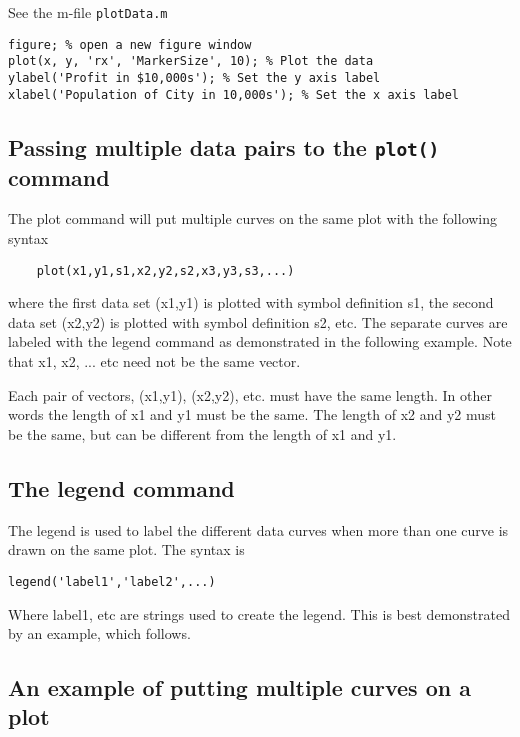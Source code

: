 \documentclass[12pt]{article}
\begin{document}
See the m-file \texttt{plotData.m}
\begin{framed}
\begin{verbatim}
figure; % open a new figure window
plot(x, y, 'rx', 'MarkerSize', 10); % Plot the data
ylabel('Profit in $10,000s'); % Set the y axis label
xlabel('Population of City in 10,000s'); % Set the x axis label
\end{verbatim}
\end{framed}
\subsection{Passing multiple data pairs to the \texttt{plot()} command}

The plot command will put multiple curves on the same plot with the following syntax
\begin{verbatim}
	plot(x1,y1,s1,x2,y2,s2,x3,y3,s3,...)
\end{verbatim}

where the first data set (x1,y1) is plotted with symbol definition s1, the second data set (x2,y2) is plotted with symbol definition s2, etc. The separate curves are labeled with the legend command as demonstrated in the following example.
Note that x1, x2, ... etc need not be the same vector.

Each pair of vectors, (x1,y1), (x2,y2), etc. must have the same length. In other words the length of x1 and y1 must be the same. The length of x2 and y2 must be the same, but can be different from the length of x1 and y1.


\subsection{The legend command}

The legend is used to label the different data curves when more than one curve is drawn on the same plot. The syntax is
\begin{verbatim}
legend('label1','label2',...)
\end{verbatim}	
Where label1, etc are strings used to create the legend. This is best demonstrated by an example, which follows.

\subsection{An example of putting multiple curves on a plot}
\end{document}

